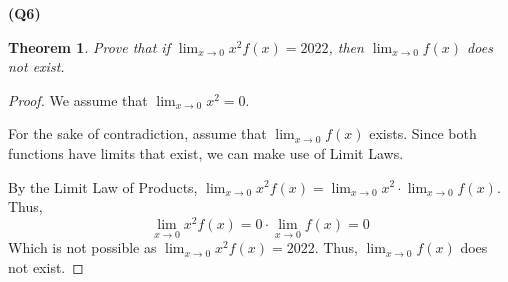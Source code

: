 \documentclass[12pt, a4paper]{article}
\newcommand{\displim}[1]{\displaystyle{\lim_{#1}}}
\newcommand{\zerolim}{\displim{x \to 0}}
\newtheorem{theorem}{Theorem}
\begin{document}
\textbf{(Q6)}
\begin{theorem}
    Prove that if $\displim{x \to 0} x^2f(x) = 2022$, then
    $\displim{x \to 0} f(x)$ does not exist.
\end{theorem}

\begin{proof}
    We assume that $\zerolim x^2 = 0$.

    For the sake of contradiction, assume that $\displim{x \to 0} f(x)$ exists. Since both
    functions have limits that exist, we can make use of Limit Laws.

    By the Limit Law of Products, $\zerolim x^2f(x) = \zerolim x^2 \cdot \zerolim f(x)$.
    Thus,
    \[
        \zerolim x^2f(x) = 0 \cdot \zerolim f(x) = 0
    \]
    Which is not possible as $\zerolim x^2f(x) = 2022$. Thus, $\zerolim f(x)$ does not
    exist.
\end{proof}
\end{document}

